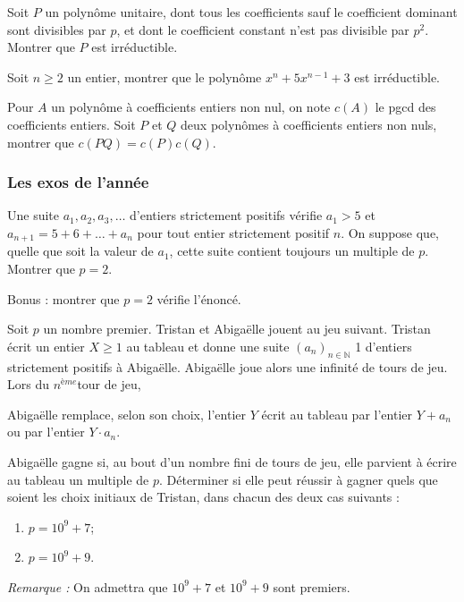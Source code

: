 \begin{exo}
 Soit $P$ un polynôme unitaire, dont tous les coefficients sauf le coefficient dominant sont divisibles par $p$, et dont le coefficient constant n'est pas divisible par $p^2$. Montrer que $P$ est irréductible.
\end{exo}


\begin{exo}
 Soit $n\geq 2$ un entier, montrer que le polynôme $x^{n} + 5x^{n - 1} + 3$ est irréductible.
\end{exo}


\begin{exo}
 Pour $A$ un polynôme à coefficients entiers non nul, on note $c(A)$ le pgcd des coefficients entiers. Soit $P$ et $Q$ deux polynômes à coefficients entiers non nuls, montrer que $c(PQ)=c(P)c(Q)$.
\end{exo}


\subsubsection{Les exos de l'année}


\begin{exo}
Une suite $a_1,a_2,a_3,\dots$ d’entiers strictement positifs vérifie $a_1>5$ et $a_{n + 1}=5 + 6 + \dots + a_n$ pour tout entier strictement positif $n$. On suppose que, quelle que soit la valeur de $a_1$, cette suite contient toujours un multiple de $p$. Montrer que $p=2$.

Bonus : montrer que $p=2$ vérifie l'énoncé.
\end{exo}


\begin{exo}
 Soit $p$ un nombre premier. Tristan et Abigaëlle jouent au jeu suivant. Tristan écrit un entier $X\geq 1$ au tableau et donne une suite $(a_n)_{n \in \mathbb N}$ 1 d’entiers strictement positifs à Abigaëlle. Abigaëlle joue alors une
infinité de tours de jeu. Lors du  $n^{\textit{ème}}$tour de jeu,
\begin{center}
Abigaëlle remplace, selon son choix, l’entier $Y$ écrit au tableau par l’entier $Y + a_n$ ou par l’entier $Y \cdot a_n$.
\end{center}
Abigaëlle gagne si, au bout d’un nombre fini de tours de jeu, elle parvient à écrire au tableau un multiple de $p$.
Déterminer si elle peut réussir à gagner quels que soient les choix initiaux de Tristan, dans chacun des deux cas
suivants :
\begin{enumerate}[label=\alph*)]
\item $p=10^9 + 7$;
\item $p=10^9 + 9$.
\end{enumerate}
\textit{Remarque :} On admettra que $10^9 + 7$ et $10^9 + 9$ sont premiers.
\end{exo}

